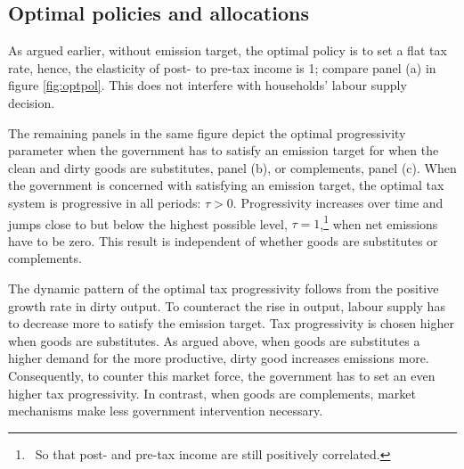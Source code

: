 \subsection{Optimal policies and allocations}
As argued earlier, without emission target, the optimal policy is to set a flat tax rate, hence, the elasticity of post- to pre-tax income is 1; compare panel (a) in figure \ref{fig:optpol}. This does not interfere with households' labour supply decision.

The remaining panels in the same figure depict the optimal progressivity parameter when the government has to satisfy an emission target for when the clean and dirty goods are substitutes, panel (b), or complements, panel (c).
When the government is concerned with satisfying an emission target, the optimal tax system is progressive in all periods: $\tau >0$. Progressivity increases over time and jumps close to but below the highest  possible level, $\tau=1$,\footnote{\ So that post- and pre-tax income are still positively correlated.} when net emissions have to be zero. This result is independent of whether goods are substitutes or complements.   

The dynamic pattern of the optimal tax progressivity follows from the positive growth rate in dirty output. To counteract the rise in output, labour supply has to decrease more to satisfy the emission target. Tax progressivity is chosen higher when goods are substitutes. As argued above, when goods are substitutes a higher demand for the more productive, dirty good increases emissions more. Consequently, to counter this market force, the government has to set an even higher tax progressivity. In contrast, when goods are complements, market mechanisms make less government intervention necessary. 



